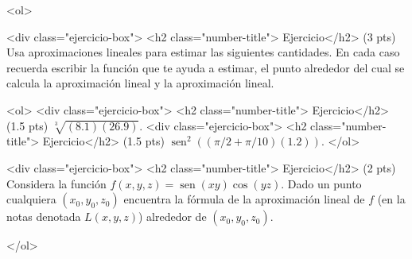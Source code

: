 \documentclass[12pt]{article}
\newcommand{\sen}{\operatorname{sen}}
\begin{document}
\bigskip

            
\bigskip
\bigskip
\bigskip


<ol>


  

  
<div class="ejercicio-box"> <h2 class="number-title"> Ejercicio</h2> (3 pts) Usa aproximaciones lineales para estimar las siguientes cantidades. En cada caso
  recuerda escribir la función que te ayuda  a estimar, el punto alrededor del cual
  se calcula la aproximación lineal y la aproximación lineal.

  <ol>
  <div class="ejercicio-box"> <h2 class="number-title"> Ejercicio</h2>(1.5 pts) $\sqrt[3]{(8.1)(26.9)}$.
    <div class="ejercicio-box"> <h2 class="number-title"> Ejercicio</h2> (1.5 pts) $\sen^2((\pi/2+\pi/10)(1.2))$.
  </ol>



  \vspace{4cm}

<div class="ejercicio-box"> <h2 class="number-title"> Ejercicio</h2> (2 pts) Considera la función $f(x,y,z)=\sen(xy)\cos(yz)$. Dado un punto cualquiera
  $(x_0,y_0,z_0)$ encuentra la fórmula de la aproximación lineal de $f$ (en la notas
  denotada $L(x,y,z)$) alrededor de $(x_0,y_0,z_0)$.
  
  </ol>


  
\end{document}
